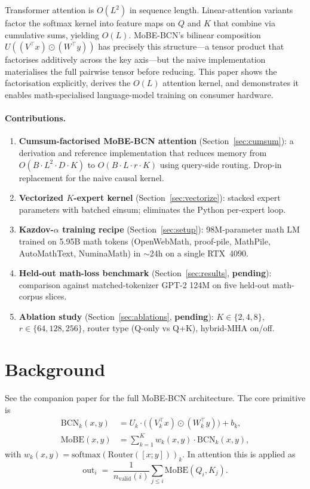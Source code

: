 \documentclass[11pt]{article}
\newcommand{\wip}[1]{{\color{wipcolor}\textbf{#1}}}
\begin{document}
Transformer attention is $O(L^2)$ in sequence length. Linear-attention
variants \citep{katharopoulos2020transformers,choromanski2020rethinking}
factor the softmax kernel into feature maps on $Q$ and $K$ that combine
via cumulative sums, yielding $O(L)$. MoBE-BCN's bilinear composition
$U((V^\top x) \odot (W^\top y))$ has precisely this structure---a tensor
product that factorises additively across the key axis---but the
naive implementation materialises the full pairwise tensor before
reducing. This paper shows the factorisation explicitly, derives the
$O(L)$ attention kernel, and demonstrates it enables math-specialised
language-model training on consumer hardware.

\paragraph{Contributions.}
\begin{enumerate}
\item \textbf{Cumsum-factorised MoBE-BCN attention} (Section~\ref{sec:cumsum}):
    a derivation and reference implementation that reduces memory from
    $O(B \cdot L^2 \cdot D \cdot K)$ to $O(B \cdot L \cdot r \cdot K)$ using
    query-side routing. Drop-in replacement for the naive causal kernel.
\item \textbf{Vectorized $K$-expert kernel} (Section~\ref{sec:vectorize}):
    stacked expert parameters with batched einsum; eliminates the
    Python per-expert loop.
\item \textbf{Kazdov-$\alpha$ training recipe} (Section~\ref{sec:setup}):
    98M-parameter math LM trained on 5.95B math tokens
    (OpenWebMath, proof-pile, MathPile, AutoMathText, NuminaMath) in
    $\sim$24h on a single RTX~4090.
\item \textbf{Held-out math-loss benchmark} (Section~\ref{sec:results},
    \wip{pending}): comparison against matched-tokenizer GPT-2 124M on
    five held-out math-corpus slices.
\item \textbf{Ablation study} (Section~\ref{sec:ablations},
    \wip{pending}): $K \in \{2, 4, 8\}$, $r \in \{64, 128, 256\}$,
    router type (Q-only vs Q+K), hybrid-MHA on/off.
\end{enumerate}

\section{Background}

See the companion paper \citep{dovzak2026mobebcn} for the full MoBE-BCN
architecture. The core primitive is
\begin{align}
\text{BCN}_k(x, y) &= U_k \cdot \bigl((V_k^\top x) \odot (W_k^\top y)\bigr) + b_k,\\
\text{MoBE}(x, y) &= \sum_{k=1}^{K} w_k(x, y) \cdot \text{BCN}_k(x, y),
\end{align}
with $w_k(x, y) = \mathrm{softmax}(\text{Router}([x ; y]))_k$. In attention
this is applied as
\[
\text{out}_i \;=\; \frac{1}{n_{\mathrm{valid}}(i)} \sum_{j \leq i} \text{MoBE}(Q_i, K_j).
\]
\end{document}
